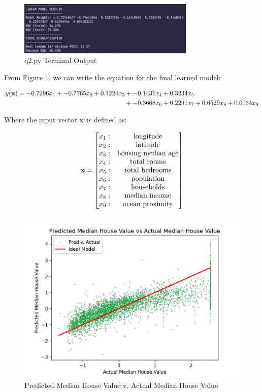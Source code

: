 \documentclass[11pt]{article}
\begin{document}
\begin{figure}[h!]
  \includegraphics[width=0.75\textwidth]{../outputs/q2.png}
  \centering
  \caption{q2.py Terminal Output}
  \label{fig:q2out}
\end{figure}

From Figure \ref{fig:q2out}, we can write the equation for the final learned model:

\begin{align*}
  y(\vb{x}) = -0.7296x_1 + -0.7765x_2 + 0.1224x_3 &+ -0.1431x_4 + 0.3234x_5 \\
  &+ -0.3668x_6 + 0.2291x_7 + 0.6529x_8 + 0.0034x_9 
\end{align*}

Where the input vector \(\vb{x}\) is defined as:

\begin{equation*}
  \vb{x} = \begin{bmatrix}
    x_1:  &\text{longitude} \\
    x_2: &\text{latitude} \\
    x_3: &\text{housing median age} \\
    x_4: &\text{total rooms} \\
    x_5: &\text{total bedrooms} \\
    x_6: &\text{population} \\
    x_7: &\text{households} \\
    x_8: &\text{median income} \\
    x_9: &\text{ocean proximity} \\
  \end{bmatrix}
\end{equation*}

\begin{figure}[h!]
  \includegraphics[width=\textwidth]{../plots/q2_pred_vs_actual.png}
  \centering
  \caption{Predicted Median House Value v. Actual Median House Value}
  \label{fig:predvact}
\end{figure}
\end{document}
